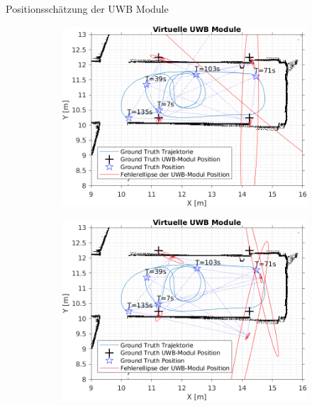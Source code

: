\documentclass{beamer}
\begin{document}
\begin{frame}{Positionsschätzung der UWB Module}
\begin{figure}
\begin{subfigure}{0.41\linewidth}
		\end{subfigure}
		\par
		\bigskip
		\begin{subfigure}{0.41\linewidth}
			\centering
			\includegraphics[width=\linewidth]{Record_2018-02-08-12-33-53_filtered_5_beacon_error}
		\end{subfigure}
		\hfill
		\begin{subfigure}{0.41\linewidth}
			\centering
			\includegraphics[width=\linewidth]{Record_2018-02-08-12-33-53_filtered_4_beacon_error}
		\end{subfigure}
	\end{figure}

\end{frame}
\end{document}
